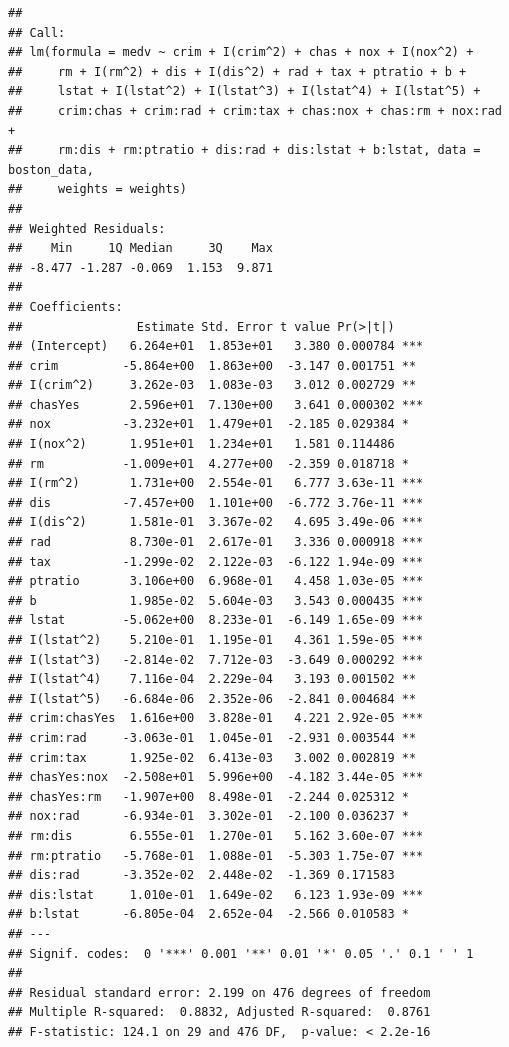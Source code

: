 \documentclass[
]{article}
\begin{document}
\begin{verbatim}
## 
## Call:
## lm(formula = medv ~ crim + I(crim^2) + chas + nox + I(nox^2) + 
##     rm + I(rm^2) + dis + I(dis^2) + rad + tax + ptratio + b + 
##     lstat + I(lstat^2) + I(lstat^3) + I(lstat^4) + I(lstat^5) + 
##     crim:chas + crim:rad + crim:tax + chas:nox + chas:rm + nox:rad + 
##     rm:dis + rm:ptratio + dis:rad + dis:lstat + b:lstat, data = boston_data, 
##     weights = weights)
## 
## Weighted Residuals:
##    Min     1Q Median     3Q    Max 
## -8.477 -1.287 -0.069  1.153  9.871 
## 
## Coefficients:
##                Estimate Std. Error t value Pr(>|t|)    
## (Intercept)   6.264e+01  1.853e+01   3.380 0.000784 ***
## crim         -5.864e+00  1.863e+00  -3.147 0.001751 ** 
## I(crim^2)     3.262e-03  1.083e-03   3.012 0.002729 ** 
## chasYes       2.596e+01  7.130e+00   3.641 0.000302 ***
## nox          -3.232e+01  1.479e+01  -2.185 0.029384 *  
## I(nox^2)      1.951e+01  1.234e+01   1.581 0.114486    
## rm           -1.009e+01  4.277e+00  -2.359 0.018718 *  
## I(rm^2)       1.731e+00  2.554e-01   6.777 3.63e-11 ***
## dis          -7.457e+00  1.101e+00  -6.772 3.76e-11 ***
## I(dis^2)      1.581e-01  3.367e-02   4.695 3.49e-06 ***
## rad           8.730e-01  2.617e-01   3.336 0.000918 ***
## tax          -1.299e-02  2.122e-03  -6.122 1.94e-09 ***
## ptratio       3.106e+00  6.968e-01   4.458 1.03e-05 ***
## b             1.985e-02  5.604e-03   3.543 0.000435 ***
## lstat        -5.062e+00  8.233e-01  -6.149 1.65e-09 ***
## I(lstat^2)    5.210e-01  1.195e-01   4.361 1.59e-05 ***
## I(lstat^3)   -2.814e-02  7.712e-03  -3.649 0.000292 ***
## I(lstat^4)    7.116e-04  2.229e-04   3.193 0.001502 ** 
## I(lstat^5)   -6.684e-06  2.352e-06  -2.841 0.004684 ** 
## crim:chasYes  1.616e+00  3.828e-01   4.221 2.92e-05 ***
## crim:rad     -3.063e-01  1.045e-01  -2.931 0.003544 ** 
## crim:tax      1.925e-02  6.413e-03   3.002 0.002819 ** 
## chasYes:nox  -2.508e+01  5.996e+00  -4.182 3.44e-05 ***
## chasYes:rm   -1.907e+00  8.498e-01  -2.244 0.025312 *  
## nox:rad      -6.934e-01  3.302e-01  -2.100 0.036237 *  
## rm:dis        6.555e-01  1.270e-01   5.162 3.60e-07 ***
## rm:ptratio   -5.768e-01  1.088e-01  -5.303 1.75e-07 ***
## dis:rad      -3.352e-02  2.448e-02  -1.369 0.171583    
## dis:lstat     1.010e-01  1.649e-02   6.123 1.93e-09 ***
## b:lstat      -6.805e-04  2.652e-04  -2.566 0.010583 *  
## ---
## Signif. codes:  0 '***' 0.001 '**' 0.01 '*' 0.05 '.' 0.1 ' ' 1
## 
## Residual standard error: 2.199 on 476 degrees of freedom
## Multiple R-squared:  0.8832, Adjusted R-squared:  0.8761 
## F-statistic: 124.1 on 29 and 476 DF,  p-value: < 2.2e-16
\end{verbatim}
\end{document}
